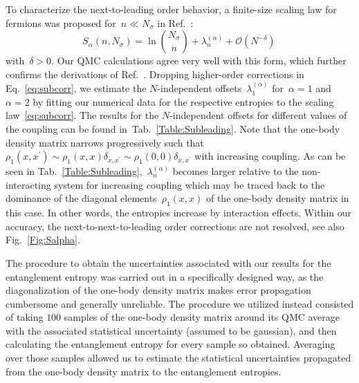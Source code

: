 \documentclass[pra,aps,groupedaddress,floatfix,twocolumn,superscriptaddress,showpacs,nofootinbib]{revtex4-1}
\newcommand{\beq}{\begin{equation}}
\newcommand{\eeq}{\end{equation}}
\begin{document}
To characterize the {next-to-leading order} behavior, {a finite-size scaling law for fermions}
was {proposed for~$n\ll N_{\sigma}$ in Ref.~\cite{2017arXiv170310587B,*PhysRevA.78.042326}:
%
\beq
S_{\alpha}(n,N_{\sigma}) = \ln \binom{N_{\sigma}}{n} + \lambda_n^{(\alpha)} + \mathcal{O}(N^{-\delta})\,\label{eq:subcorr}
\eeq
%
with~$\delta >0$.
Our QMC calculations agree very well with this form, which further confirms the derivations of Ref.~\cite{2017arXiv170310587B}.
Dropping higher-order corrections
in Eq.~\eqref{eq:subcorr}, we estimate the $N$-independent offsets~$\lambda_1^{(\alpha)}$
for~$\alpha=1$ and~$\alpha=2$ by fitting our numerical data for
the respective entropies to the scaling law~\eqref{eq:subcorr}.
The results for the $N$-independent offsets for different values of the coupling can be found in~{Tab.~\ref{Table:Subleading}.}
{Note that the one-body density matrix narrows progressively
such that~$\rho_1(x,x^{\prime})\sim \rho_1(x,x)\delta_{x,x^{\prime}}\sim\rho_1(0,0)\delta_{x,x^{\prime}}$ with increasing coupling.
As can be seen in Tab.~\ref{Table:Subleading},~$\lambda_n^{(\alpha)}$ becomes larger relative to the non-interacting system for increasing coupling
which may be traced back to the dominance of
the diagonal elements~$\rho_1(x,x)$ of the one-body density matrix in this case.
In other words, the entropies increase by interaction effects.
Within} our accuracy, the next-to-next-to-leading order corrections are not resolved, see also Fig.~\ref{Fig:Salpha}.}

The procedure to obtain the uncertainties associated with our results for the entanglement entropy was carried out in
a specifically designed way, as the diagonalization of the one-body density matrix makes error propagation cumbersome and
generally unreliable. The procedure we utilized instead consisted of taking $100$ samples of the one-body density matrix around its QMC average
with the associated statistical uncertainty (assumed to be gaussian), and then calculating the entanglement entropy for every sample so obtained.
Averaging over those samples allowed us to estimate the statistical uncertainties propagated from the one-body density matrix to the
entanglement entropies.
\end{document}
